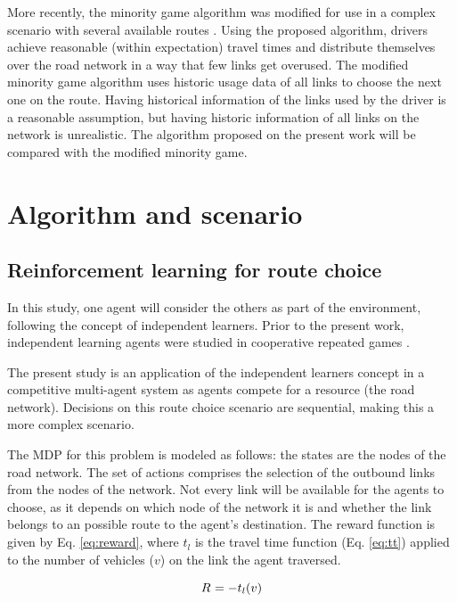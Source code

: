 \documentclass[12pt]{llncs}
\newcommand{\travTime}{\ensuremath{t_l}} 	%
\newcommand{\veh}{\ensuremath{v}}		%
\newcommand{\reward}[1][]{\ensuremath{R_#1}}	%
\begin{document}
More recently, the minority game algorithm was modified for use in a complex scenario with several available routes \cite{Galib&Moser2011}. Using the proposed algorithm, drivers achieve reasonable (within expectation) travel times and distribute themselves over the road network in a way that few links get overused. The modified minority game algorithm uses historic usage data of all links to choose the next one on the route. Having historical information of the links used by the driver is a reasonable assumption, but having historic information of all links on the network is unrealistic. The algorithm proposed on the present work will be compared with the modified minority game. 

\section{Algorithm and scenario}
\label{sec:proposal}

\subsection{Reinforcement learning for route choice}

In this study, one agent will consider the others as part of the environment, following the concept of independent learners. Prior to the present work, independent learning agents were studied in cooperative repeated games \cite{Claus&Boutilier1998, Tan1993, Sen+1994}.

The present study is an application of the independent learners concept in a competitive multi-agent system as agents compete for a resource (the road network). Decisions on this route choice scenario are sequential, making this a more complex scenario. %

The MDP for this problem is modeled as follows: the states are the nodes of the road network. The set of actions comprises the selection of the outbound links from the nodes of the network. Not every link will be available for the agents to choose, as it depends on which node of the network it is and whether the link belongs to an possible route to the agent's destination. The reward function is given by Eq. \eqref{eq:reward}, where $\travTime$ is the travel time function (Eq. \eqref{eq:tt}) applied to the number of vehicles ($\veh$) on the link the agent traversed.

\begin{equation}
\label{eq:reward}
\reward{} = - \travTime(\veh)
\end{equation}
\end{document}
